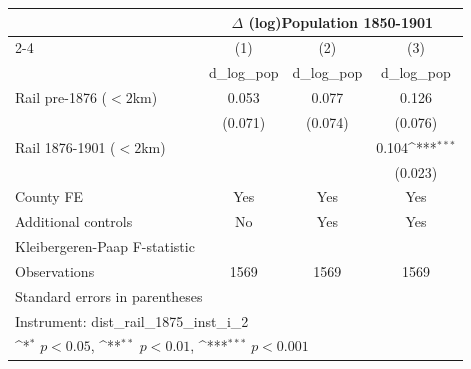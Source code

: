 {
\def\sym#1{\ifmmode^{#1}\else\(^{#1}\)\fi}
\begin{tabular}{l*{3}{c}}
\toprule
                &\multicolumn{3}{c}{$\Delta$ (log)Population 1850-1901}  \\\cmidrule(lr){2-4}
                &\multicolumn{1}{c}{(1)}&\multicolumn{1}{c}{(2)}&\multicolumn{1}{c}{(3)}\\
                &\multicolumn{1}{c}{d\_log\_pop}&\multicolumn{1}{c}{d\_log\_pop}&\multicolumn{1}{c}{d\_log\_pop}\\
\midrule
Rail pre-1876 ($<2$km)&    0.053         &    0.077         &    0.126         \\
                &  (0.071)         &  (0.074)         &  (0.076)         \\
Rail 1876-1901 ($<2$km)&                  &                  &    0.104\sym{***}\\
                &                  &                  &  (0.023)         \\
County FE       &      Yes         &      Yes         &      Yes         \\
Additional controls &       No         &      Yes         &      Yes         \\
\midrule
Kleibergeren-Paap F-statistic&                  &                  &                  \\
Observations    &     1569         &     1569         &     1569         \\
\bottomrule
\multicolumn{4}{l}{\footnotesize Standard errors in parentheses}\\
\multicolumn{4}{l}{\footnotesize Instrument: dist\_rail\_1875\_inst\_i\_2}\\
\multicolumn{4}{l}{\footnotesize \sym{*} \(p<0.05\), \sym{**} \(p<0.01\), \sym{***} \(p<0.001\)}\\
\end{tabular}
}
